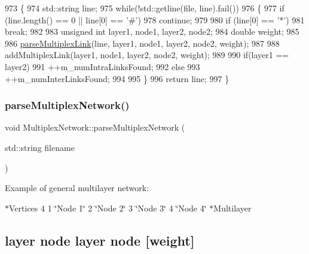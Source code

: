 \begin{DoxyCode}
973 \{
974     std::string line;
975     \textcolor{keywordflow}{while}(!std::getline(file, line).fail())
976     \{
977         \textcolor{keywordflow}{if} (line.length() == 0 || line[0] == \textcolor{charliteral}{'#'})
978             \textcolor{keywordflow}{continue};
979 
980         \textcolor{keywordflow}{if} (line[0] == \textcolor{charliteral}{'*'})
981             \textcolor{keywordflow}{break};
982 
983         \textcolor{keywordtype}{unsigned} \textcolor{keywordtype}{int} layer1, node1, layer2, node2;
984         \textcolor{keywordtype}{double} weight;
985 
986         \mbox{\hyperlink{classMultiplexNetwork_acb4b8c1bb1c8d4fd613ca467436e18eb}{parseMultiplexLink}}(line, layer1, node1, layer2, node2, weight);
987 
988         addMultiplexLink(layer1, node1, layer2, node2, weight);
989 
990         \textcolor{keywordflow}{if}(layer1 == layer2)
991             ++m\_numIntraLinksFound;
992         \textcolor{keywordflow}{else}
993             ++m\_numInterLinksFound;
994 
995     \}
996     \textcolor{keywordflow}{return} line;
997 \}
\end{DoxyCode}
\mbox{\label{classMultiplexNetwork_adef6c48117bba4729ad4067ee886860d}} 
\subsubsection{\texorpdfstring{parse\+Multiplex\+Network()}{parseMultiplexNetwork()}}
{\footnotesize\ttfamily void Multiplex\+Network\+::parse\+Multiplex\+Network (\begin{DoxyParamCaption}\item[{std\+::string}]{filename }\end{DoxyParamCaption})\hspace{0.3cm}{\ttfamily [protected]}}

Example of general multilayer network\+:

$\ast$\+Vertices 4 1 \char`\"{}\+Node 1\char`\"{} 2 \char`\"{}\+Node 2\char`\"{} 3 \char`\"{}\+Node 3\char`\"{} 4 \char`\"{}\+Node 4\char`\"{} $\ast$\+Multilayer \subsection*{layer node layer node \mbox{[}weight\mbox{]}}

